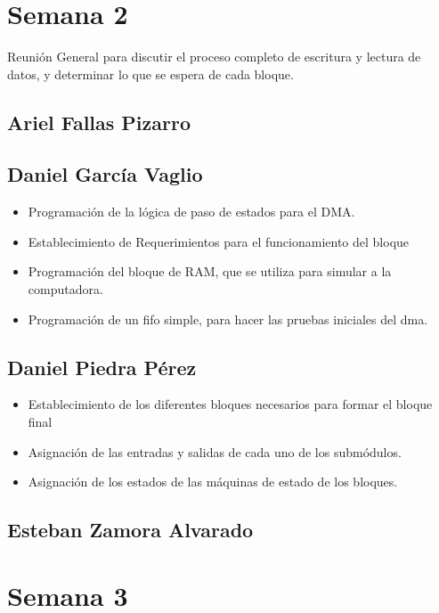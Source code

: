 \newpage
\section{Semana 2}

Reunión General para discutir el proceso completo de escritura y lectura de datos, y determinar lo
que se espera de cada bloque. 
\subsection{Ariel Fallas Pizarro}


\subsection{Daniel García Vaglio}
\begin{itemize}
\item Programación de la lógica de paso de estados para el DMA.
\item Establecimiento de Requerimientos para el funcionamiento del bloque
\item Programación del bloque de RAM, que se utiliza para simular a la computadora. 
\item Programación de un fifo simple, para hacer las pruebas iniciales del dma.
\end{itemize}


\subsection{Daniel Piedra Pérez}
\begin{itemize}
\item Establecimiento de los diferentes bloques necesarios para formar el bloque final
\item Asignación de las entradas y salidas de cada uno de los submódulos.
\item Asignación de los estados de las máquinas de estado de los bloques.
\end{itemize}

\subsection{Esteban Zamora Alvarado}

\newpage
\section{Semana 3}
